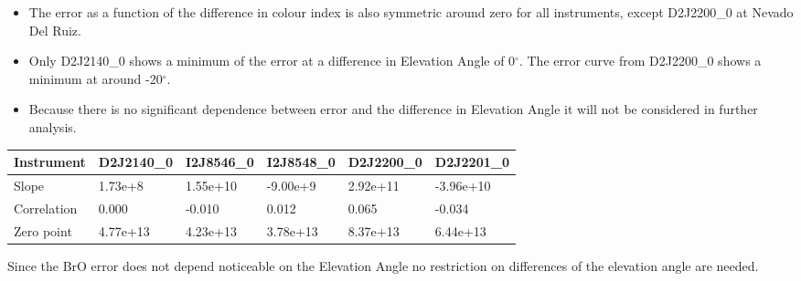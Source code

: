 \documentclass  [
  paper    = a4,
  BCOR     = 10mm,
  twoside,
  fontsize = 12pt,
  fleqn,
  toc      = bibnumbered,
  toc      = listofnumbered,
  numbers  = noendperiod,
  headings = normal,
  listof   = leveldown,
  version  = 3.03
]                                       {scrreprt}
\begin{document}
	\begin{itemize}
		\item The   error as a function of the difference in colour index is also symmetric around zero for all instruments, except  D2J2200\_0 at Nevado Del Ruiz. 
		\item Only D2J2140\_0 shows a minimum of the   error at a difference in Elevation Angle of 0$^{\circ}$. The   error curve from D2J2200\_0 shows a minimum at around -20$^{\circ}$.
		\item Because there is no significant dependence between   error and the difference in Elevation Angle it will not be considered in further analysis.
	\end{itemize}
	\begin{table}[h]
		\begin{tabular}{|p{2cm}|p{2cm}|p{2cm}|p{2cm}|p{2cm}|p{2cm}|}
			Instrument	&D2J2140\_0&I2J8546\_0& I2J8548\_0&D2J2200\_0&D2J2201\_0\\
			\toprule
			Slope& 1.73e+8& 1.55e+10  &-9.00e+9 &2.92e+11&-3.96e+10\\
			\midrule
			Correlation&
			0.000&
			-0.010&
			0.012&
			0.065&
			-0.034\\
			\midrule
			Zero point&4.77e+13&4.23e+13&3.78e+13&8.37e+13 &6.44e+13 \\
			\bottomrule
		\end{tabular}
	\end{table}
	Since the BrO error does not depend noticeable on the Elevation Angle no restriction on differences of the elevation angle are needed.
\end{document}
